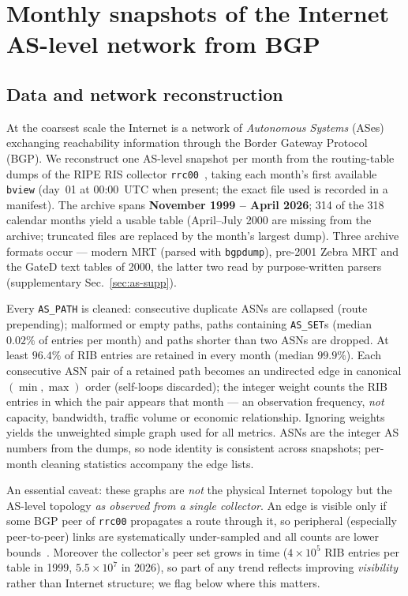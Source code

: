 \chapter{Monthly snapshots of the Internet AS-level network from BGP}


\section{Data and network reconstruction}

At the coarsest scale the Internet is a network of \emph{Autonomous Systems}
(ASes) exchanging reachability information through the Border Gateway Protocol
(BGP). We reconstruct one AS-level snapshot per month from the routing-table
dumps of the RIPE RIS collector \texttt{rrc00}~\cite{ripeRIS}, taking each
month's first available \texttt{bview} (day~01 at 00:00~UTC when present; the
exact file used is recorded in a manifest). The archive
spans \textbf{November 1999 -- April 2026}; 314 of the 318 calendar months
yield a usable table (April--July 2000 are missing from the archive;
truncated files are replaced by the month's largest dump). Three archive
formats occur --- modern MRT (parsed with \texttt{bgpdump}), pre-2001 Zebra
MRT and the GateD text tables of 2000, the latter two read by purpose-written
parsers (supplementary Sec.~\ref{sec:as-supp}).

Every \texttt{AS\_PATH} is cleaned: consecutive duplicate ASNs are collapsed
(route prepending); malformed or empty paths, paths containing
\texttt{AS\_SET}s (median $0.02\%$ of entries per month) and paths shorter
than two ASNs are dropped. At least $96.4\%$ of RIB entries are retained in
every month (median $99.9\%$). Each consecutive ASN
pair of a retained path becomes an undirected edge in canonical
$(\min,\max)$ order (self-loops discarded); the integer weight counts the
RIB entries in which the pair appears that month --- an observation
frequency, \emph{not} capacity, bandwidth, traffic volume or economic
relationship. Ignoring weights yields the unweighted simple graph used for
all metrics. ASNs are the integer AS numbers from the dumps, so node identity
is consistent across snapshots; per-month cleaning statistics accompany the
edge lists.

An essential caveat: these graphs are \emph{not} the physical Internet
topology but the AS-level topology \emph{as observed from a single collector}.
An edge is visible only if some BGP peer of \texttt{rrc00} propagates a route
through it, so peripheral (especially peer-to-peer) links are systematically
under-sampled and all counts are lower bounds~\cite{oliveira2010completeness}.
Moreover the collector's peer set grows in time ($4\times10^5$ RIB entries
per table in 1999, $5.5\times10^7$ in 2026), so part of any trend reflects
improving \emph{visibility} rather than Internet structure; we flag below
where this matters.


